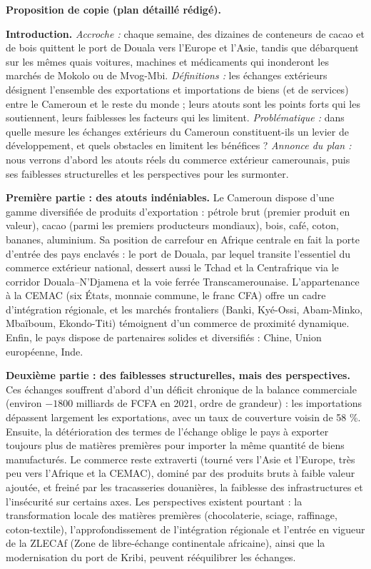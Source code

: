 \documentclass[11pt]{article}
\begin{document}
\begin{corrige}
\textbf{Proposition de copie (plan détaillé rédigé).}

\textbf{Introduction.} \emph{Accroche :} chaque semaine, des dizaines de conteneurs de cacao et de bois quittent le port de Douala vers l'Europe et l'Asie, tandis que débarquent sur les mêmes quais voitures, machines et médicaments qui inonderont les marchés de Mokolo ou de Mvog-Mbi. \emph{Définitions :} les échanges extérieurs désignent l'ensemble des exportations et importations de biens (et de services) entre le Cameroun et le reste du monde ; leurs atouts sont les points forts qui les soutiennent, leurs faiblesses les facteurs qui les limitent. \emph{Problématique :} dans quelle mesure les échanges extérieurs du Cameroun constituent-ils un levier de développement, et quels obstacles en limitent les bénéfices ? \emph{Annonce du plan :} nous verrons d'abord les atouts réels du commerce extérieur camerounais, puis ses faiblesses structurelles et les perspectives pour les surmonter.

\textbf{Première partie : des atouts indéniables.} Le Cameroun dispose d'une gamme diversifiée de produits d'exportation : pétrole brut (premier produit en valeur), cacao (parmi les premiers producteurs mondiaux), bois, café, coton, bananes, aluminium. Sa position de carrefour en Afrique centrale en fait la porte d'entrée des pays enclavés : le port de Douala, par lequel transite l'essentiel du commerce extérieur national, dessert aussi le Tchad et la Centrafrique via le corridor Douala--N'Djamena et la voie ferrée Transcamerounaise. L'appartenance à la CEMAC (six États, monnaie commune, le franc CFA) offre un cadre d'intégration régionale, et les marchés frontaliers (Banki, Kyé-Ossi, Abam-Minko, Mbaïboum, Ekondo-Titi) témoignent d'un commerce de proximité dynamique. Enfin, le pays dispose de partenaires solides et diversifiés : Chine, Union européenne, Inde.

\textbf{Deuxième partie : des faiblesses structurelles, mais des perspectives.} Ces échanges souffrent d'abord d'un déficit chronique de la balance commerciale (environ $-\num{1800}$ milliards de FCFA en 2021, ordre de grandeur) : les importations dépassent largement les exportations, avec un taux de couverture voisin de 58 \%. Ensuite, la détérioration des termes de l'échange oblige le pays à exporter toujours plus de matières premières pour importer la même quantité de biens manufacturés. Le commerce reste extraverti (tourné vers l'Asie et l'Europe, très peu vers l'Afrique et la CEMAC), dominé par des produits bruts à faible valeur ajoutée, et freiné par les tracasseries douanières, la faiblesse des infrastructures et l'insécurité sur certains axes. Les perspectives existent pourtant : la transformation locale des matières premières (chocolaterie, sciage, raffinage, coton-textile), l'approfondissement de l'intégration régionale et l'entrée en vigueur de la ZLECAf (Zone de libre-échange continentale africaine), ainsi que la modernisation du port de Kribi, peuvent rééquilibrer les échanges.


\end{corrige}
\end{document}
